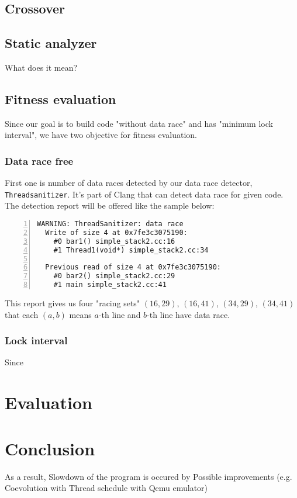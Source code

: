 \documentclass[sigconf]{acmart}
\begin{document}
\subsection{Crossover}

\subsection{Static analyzer}
What does it mean?

\subsection{Fitness evaluation}
Since our goal is to build code "without data race" and has "minimum lock interval", we have two objective for fitness evaluation. 

\subsubsection{Data race free}
First one is number of data races detected by our data race detector, \verb|Threadsanitizer|. It's part of Clang that can detect data race for given code. The detection report will be offered like the sample below:

\begin{lstlisting}[frame=tb, xleftmargin=2em, framexleftmargin=1.5em, numbers=left]
WARNING: ThreadSanitizer: data race
  Write of size 4 at 0x7fe3c3075190:
    #0 bar1() simple_stack2.cc:16
    #1 Thread1(void*) simple_stack2.cc:34

  Previous read of size 4 at 0x7fe3c3075190:
    #0 bar2() simple_stack2.cc:29
    #1 main simple_stack2.cc:41
\end{lstlisting}

This report gives us four "racing sets" $(16, 29)$, $(16, 41)$, $(34, 29)$, $(34, 41)$ that each $(a, b)$ means $a$-th line and $b$-th line have data race.
 
\subsubsection{Lock interval}
Since 

\section{Evaluation}


\section{Conclusion}
As a result,
Slowdown of the program is occured by 
Possible improvements (e.g. Coevolution with Thread schedule with Qemu emulator)
\end{document}
